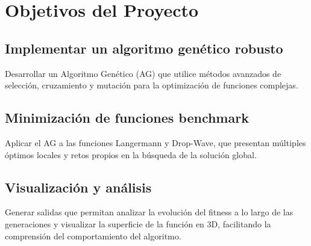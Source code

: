 \chapter{Objetivos del Proyecto}

\section{Implementar un algoritmo genético robusto}
Desarrollar un Algoritmo Genético (AG) que utilice métodos avanzados de selección, cruzamiento y mutación para la optimización de funciones complejas.

\section{Minimización de funciones benchmark}
Aplicar el AG a las funciones Langermann y Drop-Wave, que presentan múltiples óptimos locales y retos propios en la búsqueda de la solución global.

\section{Visualización y análisis}
Generar salidas que permitan analizar la evolución del fitness a lo largo de las generaciones y visualizar la superficie de la función en 3D, facilitando la comprensión del comportamiento del algoritmo.
